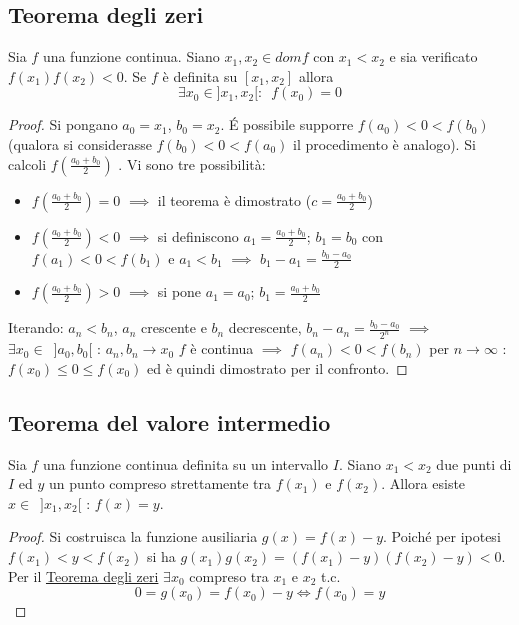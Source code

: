 \documentclass[10pt, oneside]{book}
\theoremstyle{plain}
\begin{document}
\subsection{Teorema degli zeri}
\hypertarget{zeri}{\begin{ther}
Sia $f$ una funzione continua. Siano $x_1, x_2 \in dom f$ con $x_1 < x_2$ e sia verificato $f(x_1) f(x_2) < 0$. Se $f$ è definita su $[x_1, x_2]$ allora \[\exists x_0 \in ]x_1, x_2[ : \enspace f(x_0) = 0\]
\end{ther}}
\begin{proof}
Si pongano $a_0 = x_1$, $b_0 = x_2$. \'E possibile supporre $f(a_0) < 0 < f(b_0)$ (qualora si considerasse $f(b_0) < 0 < f(a_0)$ il procedimento è analogo). \newline Si calcoli $\displaystyle f(\frac{a_0 + b_0}{2})$ . Vi sono tre possibilità:
\begin{itemize}[label=$\square$]
    \item $\displaystyle f(\frac{a_0 + b_0}{2}) = 0$ $\implies$ il teorema è dimostrato ($\displaystyle c = \frac{a_0 + b_0}{2}$)
    \item $\displaystyle f(\frac{a_0 + b_0}{2}) < 0$ $\implies$ si definiscono $\displaystyle a_1 = \frac{a_0 + b_0}{2}$; $b_1 = b_0$ con $f(a_1) < 0 < f(b_1)$ e $a_1 < b_1$ $\implies$ $\displaystyle b_1 - a_1 = \frac{b_0 - a_0}{2}$
    \item $\displaystyle f(\frac{a_0 + b_0}{2}) > 0$ $\implies$ si pone $a_1 = a_0$; $\displaystyle b_1 = \frac{a_0 + b_0}{2}$
\end{itemize}
Iterando: $a_n < b_n$, $a_n$ crescente e $b_n$ decrescente, $\displaystyle b_n - a_n = \frac{b_0 - a_0}{2^n}$ $\implies$ $\exists x_0 \in \enspace ]a_0, b_0[$ : $a_n, b_n \longrightarrow x_0$
\newline $f$ è continua $\implies$ $f(a_n) < 0 < f(b_n)$ per $n \rightarrow \infty$ : $f(x_0) \leq 0 \leq f(x_0)$ ed è quindi dimostrato per il confronto.
\end{proof}

\subsection{Teorema del valore intermedio}
\hypertarget{valint}{\begin{ther}
Sia $f$ una funzione continua definita su un intervallo $I$. Siano $x_1 < x_2$ due punti di $I$ ed $y$ un punto compreso strettamente tra $f(x_1)$ e $f(x_2)$.\newline 
Allora esiste $x \in \enspace ]x_1, x_2[$ : $f(x) = y$.
\end{ther}}
\begin{proof}
Si costruisca la funzione ausiliaria $g(x) = f(x) - y$. Poiché per ipotesi $f(x_1) < y < f(x_2)$ si ha $g(x_1) g(x_2) = (f(x_1) - y)(f(x_2) - y) < 0$. Per il \hyperlink{zeri}{Teorema degli zeri} $\exists x_0$ compreso tra $x_1$ e $x_2$ t.c. 
\[0 = g(x_0) = f(x_0) - y \Longleftrightarrow f(x_0) = y\]
\end{proof}
\end{document}
